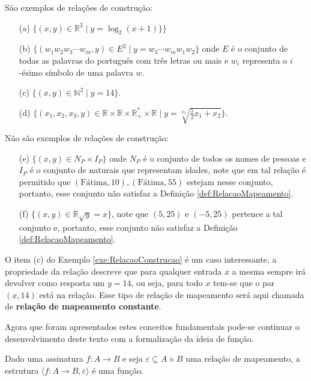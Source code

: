 \begin{example}\label{exe:RelacaoConstrucao}
	São exemplos de relações de construção:
	\begin{itemize}
		\item[(a)] $\{(x, y) \in \mathbb{R}^2 \mid y = \log_2(x + 1)\}\}$
		\item[(b)] $\{(w_1w_2w_3\cdots w_m, y) \in E^2 \mid y = w_3\cdots w_mw_1w_2\}$ onde $E$ é o conjunto de todas as palavras do português com três letras ou mais e $w_i$ representa o $i$-ésimo símbolo de uma palavra $w$.
		\item[(c)] $\{(x, y) \in \mathbb{N}^2 \mid y = 14\}$.
		\item[(d)] $\Big\{(x_1, x_2, x_3, y) \in \mathbb{R} \times \mathbb{R} \times \mathbb{R}^*_+ \times \mathbb{R} \mid y = \sqrt[x_3]{\displaystyle\frac{1}{2}x_1 + x_2}\Big\}$.
	\end{itemize}
	Não são exemplos de relações de construção:
	\begin{itemize}
		\item[(e)] $\{(x, y) \in N_P \times I_P\}$ onde $N_P$ é o conjunto de todos os nomes de pessoas e $I_P$ é o conjunto de naturais que representam idades, note que em tal relação é permitido que $(\text{Fátima}, 10), (\text{Fátima}, 55)$ estejam nesse conjunto, portanto, esse conjunto não satisfaz a Definição \ref{def:RelacaoMapeamento}.
		\item[(f)] $\{(x, y) \in \mathbb{R} \sqrt{y} = x\}$, note que $(5, 25)$ e $(-5, 25)$ pertence a tal conjunto e, portanto, esse conjunto não satisfaz a Definição \ref{def:RelacaoMapeamento}.
	\end{itemize}
\end{example}

\begin{remark}
	O item (c) do Exemplo \ref{exe:RelacaoConstrucao} é um caso interessante, a propriedade da relação descreve que para qualquer entrada $x$ a mesma sempre irá devolver como resposta um $y = 14$, ou seja, para todo $x$ tem-se que o par $(x, 14)$ está na relação. Esse tipo de relação de mapeamento será aqui chamada de \textbf{relação de mapeamento constante}.    
\end{remark}

Agora que foram apresentados estes conceitos fundamentais pode-se continuar o desenvolvimento deste texto com a formalização da ideia de função.

\begin{definition}[Função]
	Dado uma assinatura $f: A \rightarrow B$ e seja $\varepsilon \subseteq A \times B$ uma relação de mapeamento, a estrutura $\langle f: A \rightarrow B, \varepsilon \rangle$ é uma função.
\end{definition}


